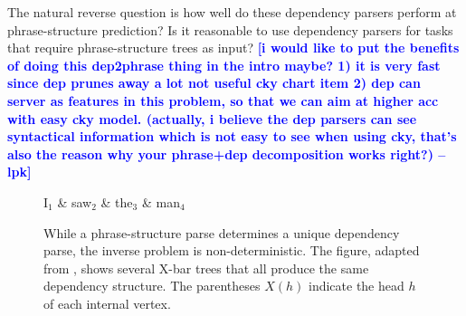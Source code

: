 \documentclass[11pt,letterpaper]{article}
\newcommand{\lpkcomment}[1]{\textcolor{blue}{\bf \small [#1 --lpk]}}
\begin{document}
The natural reverse question is how well do these dependency parsers perform at phrase-structure prediction? Is it reasonable to use dependency parsers for tasks that require phrase-structure trees as input? \lpkcomment{i would like to put the benefits of doing this dep2phrase thing in the intro maybe? 1) it is very fast since dep prunes away a lot not useful cky chart item 2) dep can server as features in this problem, so that we can aim at higher acc with easy cky model. (actually, i believe the dep parsers can see syntactical information which is not easy to see when using cky, that's also the reason why your phrase+dep decomposition works right?)}



\begin{figure}
  \centering

  \vspace{-1cm}

  \begin{dependency}[theme=simple]
    \begin{deptext}[column sep=0.7cm]
      I$_1$ \& saw$_2$ \& the$_3$ \& man$_4$ \\
    \end{deptext}
  \end{dependency}

  \label{fig:inverse}
  \caption{{\footnotesize While a phrase-structure parse determines a unique dependency parse, the inverse problem is non-deterministic. The figure, adapted from \cite{collins1999statistical}, shows several X-bar trees that all produce the same dependency structure. The parentheses $X(h)$ indicate the head $h$ of each internal vertex. }}
\end{figure}
\end{document}

